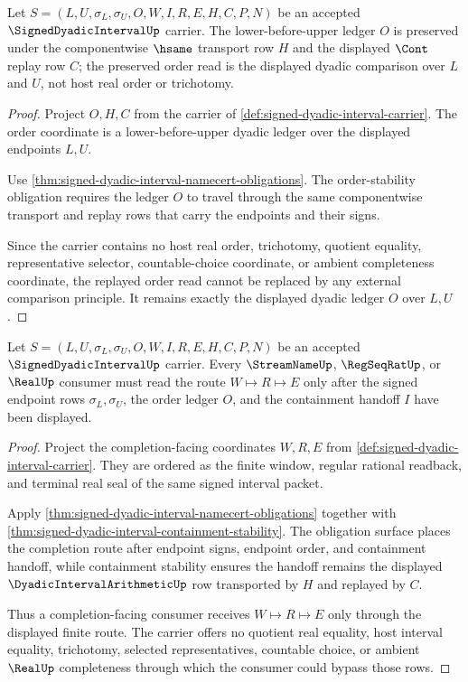 \begin{theorem}
\label{thm:signed-dyadic-interval-order-stability}
Let $S=(L,U,\sigma_L,\sigma_U,O,W,I,R,E,H,C,P,N)$ be an accepted $\SignedDyadicIntervalUp$ carrier. The lower-before-upper ledger $O$ is preserved under the componentwise $\hsame$ transport row $H$ and the displayed $\Cont$ replay row $C$; the preserved order read is the displayed dyadic comparison over $L$ and $U$, not host real order or trichotomy.
\end{theorem}
\begin{proof}
Project $O,H,C$ from the carrier of \autoref{def:signed-dyadic-interval-carrier}. The order coordinate is a lower-before-upper dyadic ledger over the displayed endpoints $L,U$.

Use \autoref{thm:signed-dyadic-interval-namecert-obligations}. The order-stability obligation requires the ledger $O$ to travel through the same componentwise transport and replay rows that carry the endpoints and their signs.

Since the carrier contains no host real order, trichotomy, quotient equality, representative selector, countable-choice coordinate, or ambient completeness coordinate, the replayed order read cannot be replaced by any external comparison principle. It remains exactly the displayed dyadic ledger $O$ over $L,U$.
\end{proof}

\begin{theorem}
\label{thm:signed-dyadic-interval-completion-boundary}
Let $S=(L,U,\sigma_L,\sigma_U,O,W,I,R,E,H,C,P,N)$ be an accepted $\SignedDyadicIntervalUp$ carrier. Every $\StreamNameUp$, $\RegSeqRatUp$, or $\RealUp$ consumer must read the route $W \longmapsto R \longmapsto E$ only after the signed endpoint rows $\sigma_L,\sigma_U$, the order ledger $O$, and the containment handoff $I$ have been displayed.
\end{theorem}
\begin{proof}
Project the completion-facing coordinates $W,R,E$ from \autoref{def:signed-dyadic-interval-carrier}. They are ordered as the finite window, regular rational readback, and terminal real seal of the same signed interval packet.

Apply \autoref{thm:signed-dyadic-interval-namecert-obligations} together with \autoref{thm:signed-dyadic-interval-containment-stability}. The obligation surface places the completion route after endpoint signs, endpoint order, and containment handoff, while containment stability ensures the handoff remains the displayed $\DyadicIntervalArithmeticUp$ row transported by $H$ and replayed by $C$.

Thus a completion-facing consumer receives $W \longmapsto R \longmapsto E$ only through the displayed finite route. The carrier offers no quotient real equality, host interval equality, trichotomy, selected representatives, countable choice, or ambient $\RealUp$ completeness through which the consumer could bypass those rows.
\end{proof}

